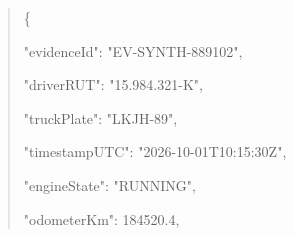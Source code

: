 \begin{quote}\ttfamily
  \{\allowbreak{}\par
    "\allowbreak{}e\allowbreak{}v\allowbreak{}i\allowbreak{}d\allowbreak{}e\allowbreak{}n\allowbreak{}c\allowbreak{}e\allowbreak{}I\allowbreak{}d\allowbreak{}"\allowbreak{}:\allowbreak{} "\allowbreak{}E\allowbreak{}V\allowbreak{}-\allowbreak{}S\allowbreak{}Y\allowbreak{}N\allowbreak{}T\allowbreak{}H\allowbreak{}-\allowbreak{}8\allowbreak{}8\allowbreak{}9\allowbreak{}1\allowbreak{}0\allowbreak{}2\allowbreak{}"\allowbreak{},\allowbreak{}\par
    "\allowbreak{}d\allowbreak{}r\allowbreak{}i\allowbreak{}v\allowbreak{}e\allowbreak{}r\allowbreak{}R\allowbreak{}U\allowbreak{}T\allowbreak{}"\allowbreak{}:\allowbreak{} "\allowbreak{}1\allowbreak{}5\allowbreak{}.\allowbreak{}9\allowbreak{}8\allowbreak{}4\allowbreak{}.\allowbreak{}3\allowbreak{}2\allowbreak{}1\allowbreak{}-\allowbreak{}K\allowbreak{}"\allowbreak{},\allowbreak{}\par
    "\allowbreak{}t\allowbreak{}r\allowbreak{}u\allowbreak{}c\allowbreak{}k\allowbreak{}P\allowbreak{}l\allowbreak{}a\allowbreak{}t\allowbreak{}e\allowbreak{}"\allowbreak{}:\allowbreak{} "\allowbreak{}L\allowbreak{}K\allowbreak{}J\allowbreak{}H\allowbreak{}-\allowbreak{}8\allowbreak{}9\allowbreak{}"\allowbreak{},\allowbreak{}\par
    "\allowbreak{}t\allowbreak{}i\allowbreak{}m\allowbreak{}e\allowbreak{}s\allowbreak{}t\allowbreak{}a\allowbreak{}m\allowbreak{}p\allowbreak{}U\allowbreak{}T\allowbreak{}C\allowbreak{}"\allowbreak{}:\allowbreak{} "\allowbreak{}2\allowbreak{}0\allowbreak{}2\allowbreak{}6\allowbreak{}-\allowbreak{}1\allowbreak{}0\allowbreak{}-\allowbreak{}0\allowbreak{}1\allowbreak{}T\allowbreak{}1\allowbreak{}0\allowbreak{}:\allowbreak{}1\allowbreak{}5\allowbreak{}:\allowbreak{}3\allowbreak{}0\allowbreak{}Z\allowbreak{}"\allowbreak{},\allowbreak{}\par
    "\allowbreak{}e\allowbreak{}n\allowbreak{}g\allowbreak{}i\allowbreak{}n\allowbreak{}e\allowbreak{}S\allowbreak{}t\allowbreak{}a\allowbreak{}t\allowbreak{}e\allowbreak{}"\allowbreak{}:\allowbreak{} "\allowbreak{}R\allowbreak{}U\allowbreak{}N\allowbreak{}N\allowbreak{}I\allowbreak{}N\allowbreak{}G\allowbreak{}"\allowbreak{},\allowbreak{}\par
    "\allowbreak{}o\allowbreak{}d\allowbreak{}o\allowbreak{}m\allowbreak{}e\allowbreak{}t\allowbreak{}e\allowbreak{}r\allowbreak{}K\allowbreak{}m\allowbreak{}"\allowbreak{}:\allowbreak{} 1\allowbreak{}8\allowbreak{}4\allowbreak{}5\allowbreak{}2\allowbreak{}0\allowbreak{}.\allowbreak{}4\allowbreak{},\allowbreak{}\par

\end{quote}
